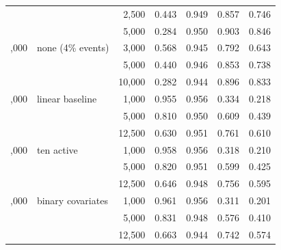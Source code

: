 \begin{tabular}{rlrrrrr}
 &  & 2,500 & 0.443 & 0.949 & 0.857 & 0.746\\
 &  & 5,000 & 0.284 & 0.950 & 0.903 & 0.846\\
\addlinespace
50,000 & none (4\% events) & 3,000 & 0.568 & 0.945 & 0.792 & 0.643\\
 &  & 5,000 & 0.440 & 0.946 & 0.853 & 0.738\\
 &  & 10,000 & 0.282 & 0.944 & 0.896 & 0.833\\
\addlinespace
25,000 & linear baseline & 1,000 & 0.955 & 0.956 & 0.334 & 0.218\\
 &  & 5,000 & 0.810 & 0.950 & 0.609 & 0.439\\
 &  & 12,500 & 0.630 & 0.951 & 0.761 & 0.610\\
\addlinespace
25,000 & ten active & 1,000 & 0.958 & 0.956 & 0.318 & 0.210\\
 &  & 5,000 & 0.820 & 0.951 & 0.599 & 0.425\\
 &  & 12,500 & 0.646 & 0.948 & 0.756 & 0.595\\
\addlinespace
25,000 & binary covariates & 1,000 & 0.961 & 0.956 & 0.311 & 0.201\\
 &  & 5,000 & 0.831 & 0.948 & 0.576 & 0.410\\
 &  & 12,500 & 0.663 & 0.944 & 0.742 & 0.574\\
\bottomrule
\end{tabular}
